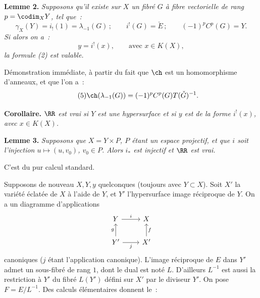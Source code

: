 \textbf{Lemme 2.} \emph{Supposons qu'il existe sur \(X\) un fibré \(G\) à fibre vectorielle de rang \(p=\codim_XY\), tel que~:}
\begin{equation}\tag{3}
  \gamma_X(Y)=i_!(1)=\lambda_{-1}(G)\,;\qquad
  i^!(G)=\check E\,;\qquad
  (-1)^pC^p(G)=Y.
\end{equation}
\emph{Si alors on a~:}
\begin{equation}\tag{4}
  y=i^!(x),\qquad \text{avec }x\in K(X),
\end{equation}
\emph{la formule (2) est valable.}

Démonstration immédiate, à partir du fait que \(\ch\) est un homomorphisme d'anneaux, et que l'on a~:
\begin{equation}\tag{5}
  \ch(\lambda_{-1}(G))=(-1)^pC^p(G)T(\check G)^{-1}.
\end{equation}

\textbf{Corollaire.} \emph{\(\RR\) est vrai si \(Y\) est une hypersurface et si \(y\) est de la forme \(i^!(x)\), avec \(x\in K(X)\).}

\textbf{Lemme 3.} \emph{Supposons que \(X=Y\times P\), \(P\) étant un espace projectif, et que \(i\) soit l'injection \(u\mapsto (u,v_0)\), \(v_0\in P\). Alors \(i_*\) est injectif et \(\RR\) est vrai.}

C'est du pur calcul standard.

Supposons de nouveau \(X,Y,y\) quelconques (toujours avec \(Y\subset X\)). Soit \(X'\) la variété éclatée de \(X\) à l'aide de \(Y\), et \(Y'\) l'hypersurface image réciproque de \(Y\). On a un diagramme d'applications
\[
\begin{tikzcd}
Y \arrow[r,"i"] & X\\
Y' \arrow[u,"g"] \arrow[r,"j"'] & X' \arrow[u,"f"']
\end{tikzcd}
\]
canoniques (\(j\) étant l'application canonique). L'image réciproque de \(E\) dans \(Y'\) admet un sous-fibré de rang \(1\), dont le dual est noté \(L\). D'ailleurs \(L^{-1}\) est aussi la restriction à \(Y'\) du fibré \(L(Y')\) défini sur \(X'\) par le diviseur \(Y'\). On pose \(F=E/L^{-1}\). Des calculs élémentaires donnent le~:

